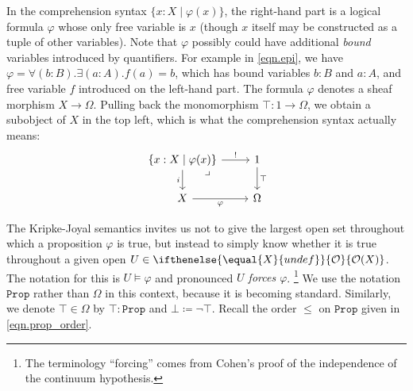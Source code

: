\documentclass[reqno,11pt]{amsproc}
\theoremstyle{plain}
\theoremstyle{definition}
\newcommand{\Const}[1]{\mathtt{#1}}
\renewcommand{\to}[1][]{\xrightarrow{#1}}
\newcommand{\prop}{\Const{Prop}}
\newcommand{\Op}[1][undef]{\ifthenelse{\equal{#1}{undef}}{\mathcal{O}}{\mathcal{O}(#1)}}
\numberwithin{equation}{section}
\begin{document}
In the comprehension syntax $\{x:X\mid\varphi(x)\}$, the right-hand part is a logical formula $\varphi$ whose only free variable is $x$ (though $x$ itself may be constructed as a tuple of other variables). Note that $\varphi$ possibly could have additional \emph{bound} variables introduced by quantifiers. For example in \eqref{eqn.epi}, we have $\varphi=\forall (b:B).\exists(a:A). f(a)=b$, which has bound variables $b:B$ and $a:A$, and free variable $f$ introduced on the left-hand part. The formula $\varphi$ denotes a sheaf morphism $X\to\Omega$. Pulling back the monomorphism $\top\colon 1\to\Omega$, we obtain a subobject of $X$ in the top left, which is what the comprehension syntax actually means:
\[
\begin{tikzcd}
	\{x:X\mid\varphi(x)\}\ar[r, "!"]\ar[d, "i"']&
	1\ar[d, "\top"]\\
	X\ar[r, "\varphi"']&
	\Omega\ar[ul, phantom, very near end, "\lrcorner"]
\end{tikzcd}
\]

The Kripke-Joyal semantics invites us not to give the largest open set throughout which a proposition $\varphi$ is true, but instead to simply know whether it is true throughout a given open $U\in\Op[X]$. The notation for this is $U\models\varphi$ and pronounced \emph{$U$ forces $\varphi$}.%
\footnote{The terminology ``forcing'' comes from Cohen's proof of the independence of the continuum hypothesis.}
We use the notation $\prop$ rather than $\Omega$ in this context, because it is becoming standard. Similarly, we denote $\top\in\Omega$ by $\top:\prop$ and $\bot\coloneqq\neg\top$. Recall the order $\le$ on $\prop$ given in \eqref{eqn.prop_order}.
\end{document}
